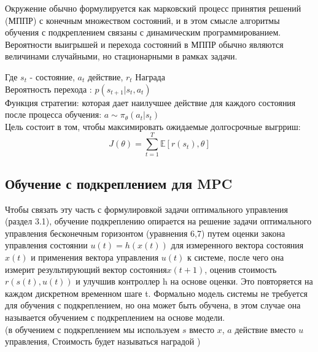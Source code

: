 \documentclass[a4paper,12pt]{article}
\begin{document}
Окружение обычно формулируется как марковский процесс принятия решений (МППР) с конечным множеством состояний, и в этом смысле алгоритмы обучения с подкреплением связаны с динамическим программированием. Вероятности выигрышей и перехода состояний в МППР обычно являются величинами случайными, но стационарными в рамках задачи.
\begin{center}
\end{center}
Где $s_t$ - состояние, $a_t$ действие, $r_t$ Награда  \\
Вероятность перехода : $p(s_{t+1}|s_t,a_t)$ \\
Функция стратегии: которая дает наилучшее действие для каждого состояния после процесса обучения: $a \sim \pi_\theta (a_t|s_t)$\\
Цель состоит в том, чтобы максимировать ожидаемые долгосрочные выгрриш:
$$J (\theta)=\sum_{t=1}^{T} \mathbb{E} [r (s_t), \theta]$$
\newpage
\subsection{Обучение с подкреплением для MPC}
Чтобы связать эту часть с формулировкой задачи оптимального управления (раздел 3.1), обучение подкреплению опирается на решение задачи оптимального управления бесконечным горизонтом (уравнения 6,7) путем оценки закона управления состоянии $u(t)=h(x(t))$ для измеренного вектора состояния $x(t)$ и применения вектора управления $u(t)$ к системе, после чего она измерит результирующий вектор состояния$x(t+1)$, оценив стоимость $r(s(t), u(t))$ и улучшив контроллер h на основе оценки. Это повторяется на каждом дискретном временном шаге t. Формально модель системы не требуется для обучения с подкреплением, но она может быть обучена, в этом случае она называется обучением с подкреплением на основе модели.\\
(в обучением с подкреплением мы используем $s$ вместо $x$, $a$ действие вместо $u$ управления, Стоимость будет называться наградой )\\
\end{document}
